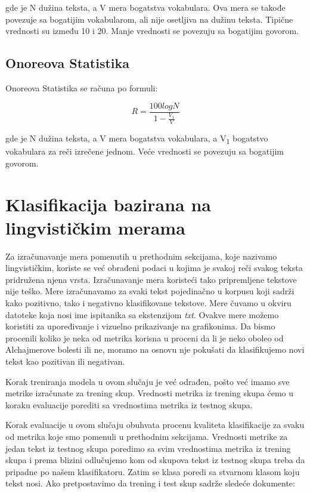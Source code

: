 \documentclass[12pt,oneside]{memoir}
\begin{document}
{\setlength{\parindent}{0cm}
gde je N dužina teksta, a V mera bogatstva vokabulara. Ova mera se takođe povezuje sa bogatijim vokabularom, ali nije osetljiva na dužinu teksta.  Tipične vrednosti su između 10 i 20. Manje vrednosti se povezuju sa bogatijim govorom. 
}
\newpage
\subsection{Onoreova Statistika}

Onoreova Statistika se računa po formuli:

\begin{equation}
	R = \frac{100logN}{1 - \frac{V_1}{V}}
\end{equation}

{\setlength{\parindent}{0cm}
gde je N dužina teksta, a V mera bogatstva vokabulara, a V\textsubscript{1} bogatstvo vokabulara za reči izrečene jednom. Veće vrednosti se povezuju sa bogatijim govorom.
}

\section{Klasifikacija bazirana na lingvističkim merama}

Za izračunavanje mera pomenutih u prethodnim sekcijama, koje nazivamo lingvističkim, koriste se već obrađeni podaci u kojima je svakoj reči svakog teksta pridružena njena vrsta. Izračunavanje mera koristeći tako pripremljene tekstove nije teško. Mere izračunavamo za svaki tekst pojedinačno u korpusu koji sadrži kako pozitivno, tako i negativno klasifikovane tekstove. Mere čuvamo u okviru datoteke koja nosi ime ispitanika sa ekstenzijom \textit{txt}. Ovakve mere možemo koristiti za upoređivanje i vizuelno prikazivanje na grafikonima. Da bismo procenili koliko je neka od metrika korisna u proceni da li je neko oboleo od Alchajmerove bolesti ili ne, moramo na osnovu nje pokušati da klasifikujemo novi tekst kao pozitivan ili negativan. 

Korak treniranja modela u ovom slučaju je već odrađen, pošto već imamo sve metrike izračunate za trening skup. Vrednosti metrika iz trening skupa ćemo u koraku evaluacije porediti sa vrednostima metrika iz testnog skupa.

Korak evaluacije u ovom slučaju obuhvata procenu kvaliteta klasifikacije za svaku od metrika koje smo pomenuli u prethodnim sekcijama. Vrednosti metrike za jedan tekst iz testnog skupa poredimo sa svim vrednostima metrika iz trening skupa i prema blizini odlučujemo kom od skupova tekst iz testnog skupa treba da pripadne po našem klasifikatoru. Zatim se klasa poredi sa stvarnom klasom koju tekst nosi.
\newpage
\noindent
Ako pretpostavimo da trening i test skup sadrže sledeće dokumente:
\end{document}
